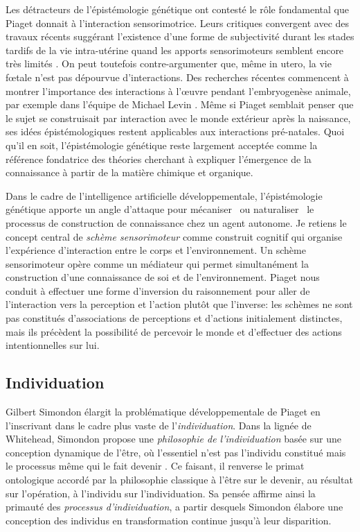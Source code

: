 Les détracteurs de l'épistémologie génétique ont contesté le rôle fondamental que Piaget donnait à l'interaction sensorimotrice.
Leurs critiques convergent avec des travaux récents suggérant l'existence d'une forme de subjectivité durant les stades tardifs de la vie intra-utérine quand les apports sensorimoteurs semblent encore très limités \cite{moser_magnetoencephalographic_2021}.
On peut toutefois contre-argumenter que, même in utero, la vie fœtale n'est pas dépourvue d'interactions. 
Des recherches récentes commencent à montrer l'importance des interactions à l'\oe uvre pendant l'embryogenèse animale, par exemple dans l'équipe de Michael Levin \cite{tung_embryos_2024}.
Même si Piaget semblait penser que le sujet se construisait par interaction avec le monde extérieur après la naissance, ses idées épistémologiques restent applicables aux interactions pré-natales. 
Quoi qu'il en soit, l'épistémologie génétique reste largement acceptée comme la référence fondatrice des théories cherchant à expliquer l'émergence de la connaissance à partir de la matière chimique et organique. 

Dans le cadre de l'intelligence artificielle développementale, l'épistémologie génétique apporte un angle d'attaque pour \og mécaniser \fg\ ou \og naturaliser \fg\ le processus de construction de connaissance chez un agent autonome.
Je retiens le concept central de \emph{schème sensorimoteur} comme construit cognitif qui organise l'expérience d'interaction entre le corps et l'environnement.
Un schème sensorimoteur opère comme un médiateur qui permet simultanément la construction d'une connaissance de soi et de l'environnement. 
Piaget nous conduit à effectuer une forme d'inversion du raisonnement pour aller de l'interaction vers la perception et l'action plutôt que l'inverse:
les schèmes ne sont pas constitués d'associations de perceptions et d'actions initialement distinctes, mais ils précèdent la possibilité de percevoir le monde et d'effectuer des actions intentionnelles sur lui. 


\subsection{Individuation}
\label{sec:individuation}

\noindent
Gilbert Simondon élargit la problématique développementale de Piaget en l'inscrivant dans le cadre plus vaste de l'\emph{individuation}.
Dans la lignée de Whitehead, Simondon propose une \emph{philosophie de l'individuation} basée sur une conception dynamique de l'être, où l'essentiel n'est pas l'individu constitué mais le processus même qui le fait devenir  \cite{simondon_individu_1995}. 
Ce faisant, il renverse le primat ontologique accordé par la philosophie classique à l'être sur le devenir, au résultat sur l'opération, à l'individu sur l'individuation. 
Sa pensée affirme ainsi la primauté des \emph{processus d'individuation}, a partir desquels Simondon élabore une conception des individus en transformation continue jusqu'à leur disparition. 

